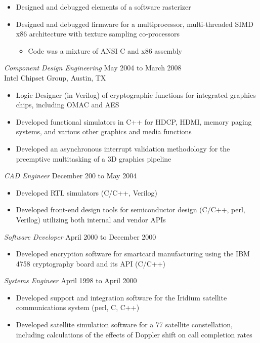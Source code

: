 \documentclass[margin]{res}
\begin{document}
\begin{resume}
\begin{itemize}
	\item Designed and debugged elements of a software rasterizer
	\item Designed and debugged firmware for a multiprocessor, multi-threaded SIMD x86 architecture with texture sampling co-processors
	\begin{itemize}
		\item Code was a mixture of ANSI C and x86 assembly
	\end{itemize}
\end{itemize}
{\sl Component Design Engineering} \hfill May 2004 to March 2008 \\
	Intel Chipset Group, Austin, TX
\begin{itemize}
	\item Logic Designer (in Verilog) of cryptographic functions for integrated graphics chips, including OMAC and AES
	\item Developed functional simulators in C++ for HDCP, HDMI, memory paging systems, and various other graphics and media functions
	\item Developed an asynchronous interrupt validation methodology for the preemptive multitasking of a 3D graphics pipeline
\end{itemize}
{\sl CAD Engineer} \hfill December 200 to May 2004 \\
\begin{itemize}
	\item Developed RTL simulators (C/C++, Verilog)
	\item Developed front-end design tools for semiconductor design (C/C++, perl, Verilog) utilizing both internal and vendor APIs
\end{itemize}
{\sl Software Developer} \hfill April 2000 to December 2000 \\
\begin{itemize}
	\item Developed encryption software for smartcard manufacturing using the IBM 4758 cryptography board and its API (C/C++)
\end{itemize}
{\sl Systems Engineer} \hfill April 1998 to April 2000 \\
\begin{itemize}
	\item Developed support and integration software for the Iridium satellite communications system (perl, C, C++)
	\item Developed satellite simulation software for a 77 satellite constellation, including calculations of the effects of Doppler shift on call completion rates
\end{itemize}

\end{resume}
\end{document}
